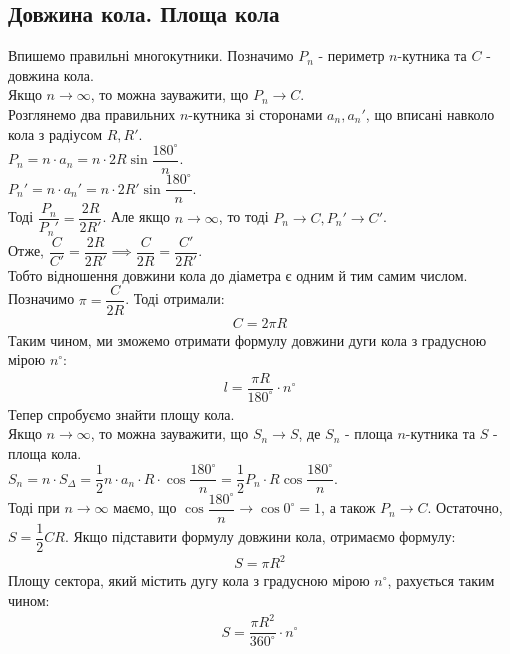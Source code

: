 \documentclass[a4paper, 10pt]{article}
\theoremstyle{theoremdd}
\theoremstyle{theoremdd}
\theoremstyle{theoremdd}
\theoremstyle{theoremdd}
\theoremstyle{theoremdd}
\theoremstyle{theoremdd}
\theoremstyle{theoremdd}
\theoremstyle{theoremdd}
\theoremstyle{theoremdd}
\begin{document}
\subsection{Довжина кола. Площа кола}
Впишемо правильні многокутники. Позначимо $P_n$ - периметр $n$-кутника та $C$ - довжина кола. \\
Якщо $n \to \infty$, то можна зауважити, що $P_n \to C$.
\bigskip \\
Розглянемо два правильних $n$-кутника зі сторонами $a_n, a_n'$, що вписані навколо кола з радіусом $R,R'$.\\
$P_n = n \cdot a_n = n \cdot 2R \sin \dfrac{180^\circ}{n}$.\\
$P_n' = n \cdot a_n' = n \cdot 2R' \sin \dfrac{180^\circ}{n}$.\\
Тоді $\dfrac{P_n}{P_n'} = \dfrac{2R}{2R'}$. Але якщо $n \to \infty$, то тоді $P_n \to C, P_n' \to C'$.\\
Отже, $\dfrac{C}{C'} = \dfrac{2R}{2R'} \implies \dfrac{C}{2R} = \dfrac{C'}{2R'}$.\\
Тобто відношення довжини кола до діаметра є одним й тим самим числом.\\
Позначимо $\pi = \dfrac{C}{2R}$. Тоді отримали:
\begin{align*}
C = 2\pi R
\end{align*}
Таким чином, ми зможемо отримати формулу довжини дуги кола з градусною мірою $n^\circ$:
\begin{align*}
l = \dfrac{\pi R}{180^\circ} \cdot n^\circ
\end{align*}
Тепер спробуємо знайти площу кола.\\
Якщо $n \to \infty$, то можна зауважити, що $S_n \to S$, де $S_n$ - площа $n$-кутника та $S$ - площа кола.
\bigskip \\
$S_n = n \cdot S_{\Delta} = \dfrac{1}{2} n \cdot a_n \cdot R \cdot \cos \dfrac{180^\circ}{n} = \dfrac{1}{2} P_n \cdot R \cos \dfrac{180^\circ}{n}$.\\
Тоді при $n \to \infty$ маємо, що $\cos \dfrac{180^\circ}{n} \to \cos 0^\circ = 1$, а також $P_n \to C$. Остаточно,\\
$S = \dfrac{1}{2} CR$. Якщо підставити формулу довжини кола, отримаємо формулу:
\begin{align*}
S = \pi R^2
\end{align*}
Площу сектора, який містить дугу кола з градусною мірою $n^\circ$, рахується таким чином:
\begin{align*}
S = \dfrac{\pi R^2}{360^\circ} \cdot n^\circ
\end{align*}
\end{document}
